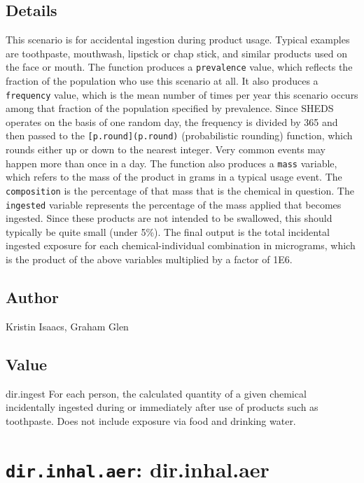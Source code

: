\documentclass[
]{article}
\begin{document}
\hypertarget{details-9}{%
\subsection{Details}\label{details-9}}

This scenario is for accidental ingestion during product usage. Typical
examples are toothpaste, mouthwash, lipstick or chap stick, and similar
products used on the face or mouth. The function produces a
\texttt{prevalence} value, which reflects the fraction of the population
who use this scenario at all. It also produces a \texttt{frequency}
value, which is the mean number of times per year this scenario occurs
among that fraction of the population specified by prevalence. Since
SHEDS operates on the basis of one random day, the frequency is divided
by 365 and then passed to the \texttt{{[}p.round{]}(p.round)}
(probabilistic rounding) function, which rounds either up or down to the
nearest integer. Very common events may happen more than once in a day.
The function also produces a \texttt{mass} variable, which refers to the
mass of the product in grams in a typical usage event. The
\texttt{composition} is the percentage of that mass that is the chemical
in question. The \texttt{ingested} variable represents the percentage of
the mass applied that becomes ingested. Since these products are not
intended to be swallowed, this should typically be quite small (under
5\%). The final output is the total incidental ingested exposure for
each chemical-individual combination in micrograms, which is the product
of the above variables multiplied by a factor of 1E6.

\hypertarget{author-10}{%
\subsection{Author}\label{author-10}}

Kristin Isaacs, Graham Glen

\hypertarget{value-10}{%
\subsection{Value}\label{value-10}}

dir.ingest For each person, the calculated quantity of a given chemical
incidentally ingested during or immediately after use of products such
as toothpaste. Does not include exposure via food and drinking water.

\hypertarget{dir.inhal.aer-dir.inhal.aer}{%
\section{\texorpdfstring{\texttt{dir.inhal.aer}:
dir.inhal.aer}{dir.inhal.aer: dir.inhal.aer}}\label{dir.inhal.aer-dir.inhal.aer}}
\end{document}
